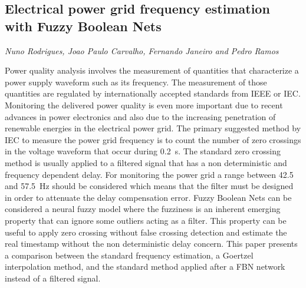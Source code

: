 \documentclass[../booklet.tex]{subfiles}
\begin{document}
\subsection[Electrical power grid frequency estimation with Fuzzy Boolean Nets. {\it Nuno Rodrigues, Joao Paulo Carvalho, Fernando Janeiro and Pedro Ramos}]{Electrical power grid frequency estimation with Fuzzy Boolean Nets}
   

\begin{center}
  {\it Nuno Rodrigues, Joao Paulo Carvalho, Fernando Janeiro and Pedro Ramos}
\end{center}

\vskip 0.8cm


Power quality analysis involves the measurement of quantities that characterize a power supply waveform such as its frequency. The measurement of those quantities are regulated by internationally accepted standards from IEEE or IEC. Monitoring the delivered power quality is even more important due to recent advances in power electronics and also due to the increasing penetration of renewable energies in the electrical power grid. The primary suggested method by IEC to measure the power grid frequency is to count the number of zero crossings in the voltage waveform that occur during 0.2~s. The standard zero crossing method is usually applied to a filtered signal that has a non deterministic and frequency dependent delay. For monitoring the power grid a range between 42.5 and 57.5~Hz should be considered which means that the filter must be designed in order to attenuate the delay compensation error. Fuzzy Boolean Nets can be considered a neural fuzzy model where the fuzziness is an inherent emerging property that can ignore some outliers acting as a filter. This property can be useful to apply zero crossing without false crossing detection and estimate the real timestamp without the non deterministic delay concern. This paper presents a comparison between the standard frequency estimation, a Goertzel interpolation method, and the standard method applied after a FBN network instead of a filtered signal.

\end{document}
